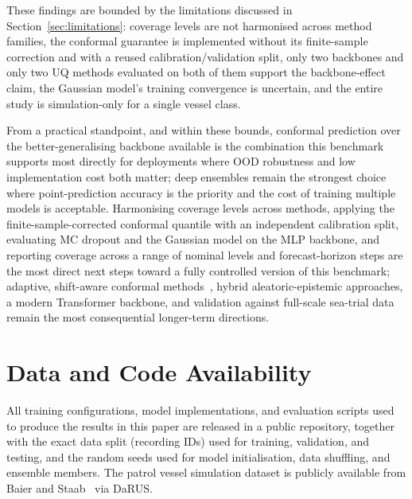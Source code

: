 \documentclass[a4paper,fleqn]{cas-sc}
\begin{document}
These findings are bounded by the limitations discussed in Section~\ref{sec:limitations}: coverage levels are not harmonised across method families, the conformal guarantee is implemented without its finite-sample correction and with a reused calibration/validation split, only two backbones and only two UQ methods evaluated on both of them support the backbone-effect claim, the Gaussian model's training convergence is uncertain, and the entire study is simulation-only for a single vessel class.

From a practical standpoint, and within these bounds, conformal prediction over the better-generalising backbone available is the combination this benchmark supports most directly for deployments where OOD robustness and low implementation cost both matter; deep ensembles remain the strongest choice where point-prediction accuracy is the priority and the cost of training multiple models is acceptable. Harmonising coverage levels across methods, applying the finite-sample-corrected conformal quantile with an independent calibration split, evaluating MC dropout and the Gaussian model on the MLP backbone, and reporting coverage across a range of nominal levels and forecast-horizon steps are the most direct next steps toward a fully controlled version of this benchmark; adaptive, shift-aware conformal methods~\cite{gibbs2021adaptive}, hybrid aleatoric-epistemic approaches, a modern Transformer backbone, and validation against full-scale sea-trial data remain the most consequential longer-term directions.

\section*{Data and Code Availability}
All training configurations, model implementations, and evaluation scripts used to produce the results in this paper are released in a public repository, together with the exact data split (recording IDs) used for training, validation, and testing, and the random seeds used for model initialisation, data shuffling, and ensemble members. The patrol vessel simulation dataset is publicly available from Baier and Staab~\cite{baier2022darus} via DaRUS.


% 
% 

\end{document}
